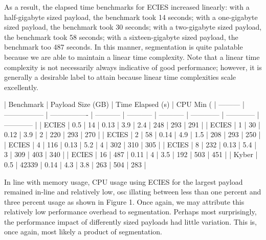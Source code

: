 \documentclass[12pt]{article}
\begin{document}
As a result, the elapsed time benchmarks for ECIES increased linearly: with a half-gigabyte sized payload, the benchmark took 14 seconds; with a one-gigabyte sized payload, the benchmark took 30 seconds; with a two-gigabyte sized payload, the benchmark took 58 seconds; with a sixteen-gigabyte sized payload, the benchmark too 487 seconds. In this manner, segmentation is quite palatable because we are able to maintain a linear time complexity. Note that a linear time complexity is not necessarily always indicative of good performance; however, it is generally a desirable label to attain because linear time complexities scale excellently. 

| Benchmark | Payload Size (GB) | Time Elapsed (s) | CPU Min (%
| --------- | ----------------- | ---------------- | ----------- | ----------- | ----------- | ------------ | ------------ | ------------ |
| ECIES     | 0.5               | 14               | 0.13        | 3.9         | 2.4         | 248          | 293          | 291          |
| ECIES     | 1                 | 30               | 0.12        | 3.9         | 2           | 220          | 293          | 270          |
| ECIES     | 2                 | 58               | 0.14        | 4.9         | 1.5         | 208          | 293          | 250          |
| ECIES     | 4                 | 116              | 0.13        | 5.2         | 4           | 302          | 310          | 305          |
| ECIES     | 8                 | 232              | 0.13        | 5.4         | 3           | 309          | 403          | 340          |
| ECIES     | 16                | 487              | 0.11        | 4           | 3.5         | 192          | 503          | 451          |
| Kyber     | 0.5               | 42339            | 0.14        | 4.3         | 3.8         | 263          | 504          | 283          |

In line with memory usage, CPU usage using ECIES for the largest payload remained in-line and relatively low, osc illating between less than one percent and three percent usage as shown in Figure 1. Once again, we may attribute this relatively low performance overhead to segmentation. Perhaps most surprisingly, the performance impact of differently sized payloads had little variation. This is, once again, most likely a product of segmentation. 
\end{document}
